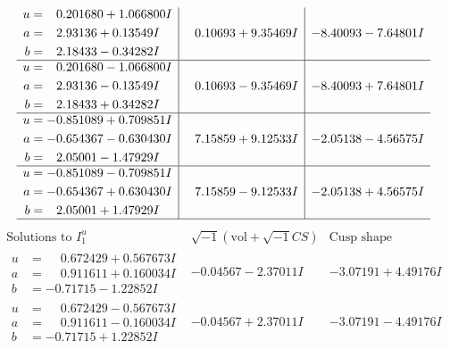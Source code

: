 \documentclass[1p]{elsarticle_modified}
\theoremstyle{definition}
\newcommand{\I}{\sqrt{-1}}
\begin{document}
$$\begin{array}{c|c|c}
\begin{aligned}
u &= \phantom{-}0.201680 + 1.066800 I \\
a &= \phantom{-}2.93136 + 0.13549 I \\
b &= \phantom{-}2.18433 - 0.34282 I\end{aligned}
 & \phantom{-}0.10693 + 9.35469 I & -8.40093 - 7.64801 I \\ \hline\begin{aligned}
u &= \phantom{-}0.201680 - 1.066800 I \\
a &= \phantom{-}2.93136 - 0.13549 I \\
b &= \phantom{-}2.18433 + 0.34282 I\end{aligned}
 & \phantom{-}0.10693 - 9.35469 I & -8.40093 + 7.64801 I \\ \hline\begin{aligned}
u &= -0.851089 + 0.709851 I \\
a &= -0.654367 - 0.630430 I \\
b &= \phantom{-}2.05001 - 1.47929 I\end{aligned}
 & \phantom{-}7.15859 + 9.12533 I & -2.05138 - 4.56575 I \\ \hline\begin{aligned}
u &= -0.851089 - 0.709851 I \\
a &= -0.654367 + 0.630430 I \\
b &= \phantom{-}2.05001 + 1.47929 I\end{aligned}
 & \phantom{-}7.15859 - 9.12533 I & -2.05138 + 4.56575 I\\
 \hline 
 \end{array}$$\newpage$$\begin{array}{c|c|c}  
\text{Solutions to }I^u_{1}& \I (\text{vol} + \sqrt{-1}CS) & \text{Cusp shape}\\
 \hline 
\begin{aligned}
u &= \phantom{-}0.672429 + 0.567673 I \\
a &= \phantom{-}0.911611 + 0.160034 I \\
b &= -0.71715 - 1.22852 I\end{aligned}
 & -0.04567 - 2.37011 I & -3.07191 + 4.49176 I \\ \hline\begin{aligned}
u &= \phantom{-}0.672429 - 0.567673 I \\
a &= \phantom{-}0.911611 - 0.160034 I \\
b &= -0.71715 + 1.22852 I\end{aligned}
 & -0.04567 + 2.37011 I & -3.07191 - 4.49176 I \\ \hline\begin{aligned}

\end{aligned}
\end{array}$$
\end{document}
